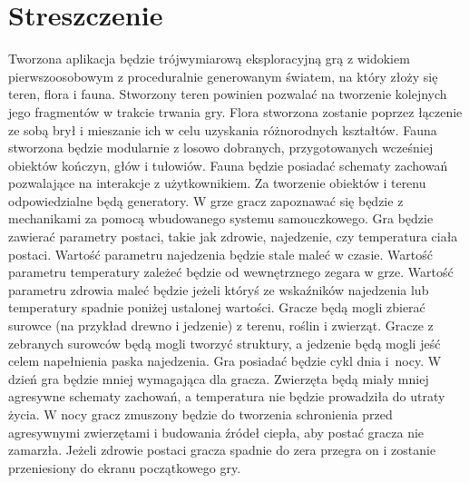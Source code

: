 \section{Streszczenie}

Tworzona aplikacja będzie trójwymiarową eksploracyjną grą z widokiem pierw\-szo\-oso\-bo\-wym z proceduralnie generowanym światem, na który złoży się teren, flora i fauna.
Stworzony teren powinien pozwalać na tworzenie kolejnych jego fragmentów w trakcie trwania gry.
Flora stworzona zostanie poprzez łączenie ze sobą brył i mieszanie ich w celu uzyskania różnorodnych kształtów.
Fauna stworzona będzie modularnie z losowo dobranych, przygotowanych wcześniej obiektów kończyn, głów i tułowiów. Fauna będzie posiadać schematy zachowań pozwalające na interakcje z użytkownikiem. 
Za tworzenie obiektów i terenu odpowiedzialne będą generatory.
W grze gracz zapoznawać się będzie z mechanikami za pomocą wbudowanego systemu samouczkowego.
Gra będzie zawierać parametry postaci, takie jak zdrowie, najedzenie, czy temperatura ciała postaci.
Wartość parametru najedzenia będzie stale maleć w czasie.
Wartość parametru temperatury zależeć będzie od wewnętrznego zegara w grze.
Wartość parametru zdrowia maleć będzie jeżeli któryś ze wskaźników najedzenia lub temperatury spadnie poniżej ustalonej wartości.
Gracze będą mogli zbierać surowce (na przykład drewno i jedzenie) z terenu, roślin i zwierząt.
Gracze z zebranych surowców będą mogli tworzyć struktury, a jedzenie będą mogli jeść celem napełnienia paska najedzenia.
Gra posiadać będzie cykl dnia i~nocy.
W dzień gra będzie mniej wymagająca dla gracza. Zwierzęta będą miały mniej agresywne schematy zachowań, a temperatura nie będzie prowadziła do utraty życia.
W nocy gracz zmuszony będzie do tworzenia schronienia przed agresywnymi zwierzętami i budowania źródeł ciepła, aby postać gracza nie zamarzła.
Jeżeli zdrowie postaci gracza spadnie do zera przegra on i zostanie przeniesiony do ekranu początkowego gry.



